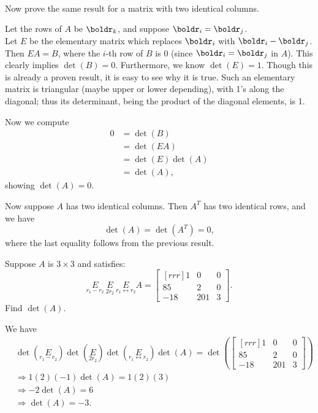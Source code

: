 \\
Now prove the same result for a matrix with two identical columns. 
\\
\begin{solution}
\noindent Let the rows of $A$ be $\boldr_k$, and suppose $\boldr_i=\boldr_j$. 
\\
Let $E$ be the elementary matrix which replaces $\boldr_i$ with $\boldr_i-\boldr_j$. 
Then $EA=B$, where the $i$-th row of $B$ is 0 (since $\boldr_i=\boldr_j$ in $A$). This clearly implies $\det(B)=0$. Furthermore, we know $\det(E)=1$. Though this is already a proven result, it is easy to see why it is true. Such an elementary matrix is triangular (maybe upper or lower depending), with 1's along the diagonal; thus its determinant, being the product of the diagonal elements, is 1. 

Now we compute 
\begin{align*}
0&=\det(B)\\
&=\det(EA)\\
&=\det(E)\det(A)\\
&=\det(A),
\end{align*}
showing $\det(A)=0$. 

Now suppose $A$ has two identical columns. Then $A^T$ has two identical rows, and we have 
\[
\det(A)=\det(A^T)=0,
\]
where the last equality follows from the previous result. 
\end{solution}
\ii Suppose $A$ is $3\times 3$ and satisfies:
\[
\underset{r_1-r_2}{E}\ \underset{2r_2}{E}\ \underset{r_1\leftrightarrow r_2}{E}A=\begin{bmatrix}[rrr]
1&0&0\\
85&2&0\\
-18&201&3
\end{bmatrix}.
\]
Find $\det(A)$. 
\\
\begin{solution}
\noindent We have 
\begin{align*}
&\det\left(\underset{r_1-r_2}{E}\right)\det\left(\underset{2r_2}{E}\right)\det\left(\underset{r_1\leftrightarrow r_2}{E}\right)\det(A)=\det\left(\begin{bmatrix}[rrr]
1&0&0\\
85&2&0\\
-18&201&3
\end{bmatrix}\right)\\
&\Rightarrow 1(2)(-1)\det(A)=1(2)(3)\\
&\Rightarrow -2\det(A)=6\\
&\Rightarrow \det(A)=-3.
\end{align*}
\end{solution}
